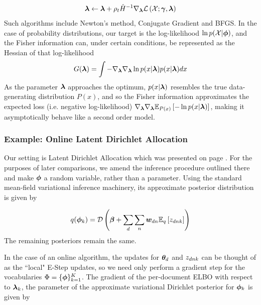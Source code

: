 \begin{align}
\varparam \leftarrow \varparam + \rho_t \inv{\hat{H}}\nabla_\varparam \elbo
\end{align}
Such algorithms include Newton's method, Conjugate Gradient and BFGS. In the case of probability distributions, our target is the log-likelihood $\ln p(\xdat|\param)$, and the Fisher information can, under certain conditions, be represented as the Hessian of that log-likelihood
\begin{align}
G(\varparam) = \int -\nabla_\varparam \nabla_\varparam \ln p(x|\varparam) p(x|\varparam) dx
\end{align}
As the parameter $\varparam$ approaches the optimum, $p(x|\varparam)$ resembles the true data-generating distribution $P(x)$, and so the Fisher information approximates the expected loss (i.e. negative log-likelihood)  $\nabla_\varparam\nabla_\varparam\ex{-\ln p(x|\varparam)}{P(x)}$, making it asymptotically behave like a second order model.


\subsubsection*{Example: Online Latent Dirichlet Allocation}

Our setting is Latent Dirichlet Allocation which was presented on page \pageref{sec:chap1:lda}. For the purposes of later comparisons, we amend the inference procedure outlined there and make $\param$ a random variable, rather than a parameter. Using the standard mean-field variational inference machinery, its approximate posterior distribution is given by

\begin{align}
q(\param_k) = \dir{\vv{\beta} + \sum_d \sum_n \vv{w}_{dn} \ex{\zdnk}{q}}
\end{align}
The remaining posteriors remain the same. 

In the case of an online algorithm, the updates for $\thd$ and $\zdnk$ can be thought of as the ``local" E-Step updates, so we need only perform a gradient step for the vocabularies $\Phi = \{ \param \}_{k=1}^K$. The gradient of the per-document ELBO with respect to $\varparam_k$, the parameter of the approximate variational Dirichlet posterior for $\param_k$ is given by

